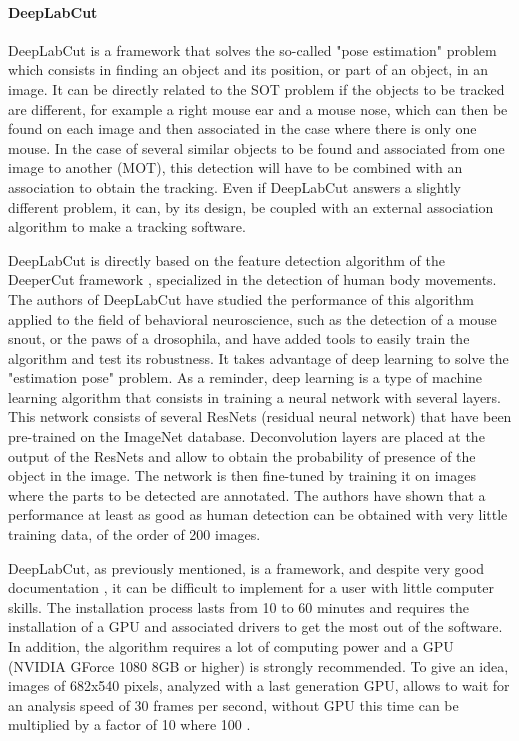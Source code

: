     \paragraph{DeepLabCut}
    DeepLabCut \cite{mathis2018deeplabcut} is a framework that solves the so-called "pose estimation" problem which consists in finding an object and its position, or part of an object, in an image. It can be directly related to the SOT problem if the objects to be tracked are different, for example a right mouse ear and a mouse nose, which can then be found on each image and then associated in the case where there is only one mouse. In the case of several similar objects to be found and associated from one image to another (MOT), this detection will have to be combined with an association to obtain the tracking. Even if DeepLabCut answers a slightly different problem, it can, by its design, be coupled with an external association algorithm to make a tracking software.

    DeepLabCut is directly based on the feature detection algorithm of the DeeperCut framework \cite{insafutdinov2016deepercut}, specialized in the detection of human body movements. The authors of DeepLabCut have studied the performance of this algorithm applied to the field of behavioral neuroscience, such as the detection of a mouse snout, or the paws of a drosophila, and have added tools to easily train the algorithm and test its robustness. It takes advantage of deep learning to solve the "estimation pose" problem. As a reminder, deep learning is a type of machine learning algorithm that consists in training a neural network with several layers. This network consists of several ResNets (residual neural network) that have been pre-trained on the ImageNet database. Deconvolution layers are placed at the output of the ResNets and allow to obtain the probability of presence of the object in the image. The network is then fine-tuned by training it on images where the parts to be detected are annotated. The authors have shown that a performance at least as good as human detection can be obtained with very little training data, of the order of 200 images.

    DeepLabCut, as previously mentioned, is a framework, and despite very good documentation \cite{nath2019using}, it can be difficult to implement for a user with little computer skills. The installation process lasts from 10 to 60 minutes and requires the installation of a GPU and associated drivers to get the most out of the software. In addition, the algorithm requires a lot of computing power and a GPU (NVIDIA GForce 1080 8GB or higher) is strongly recommended. To give an idea, images of 682x540 pixels, analyzed with a last generation GPU, allows to wait for an analysis speed of 30 frames per second, without GPU this time can be multiplied by a factor of 10 where 100 \cite{mathis2018inference}.

